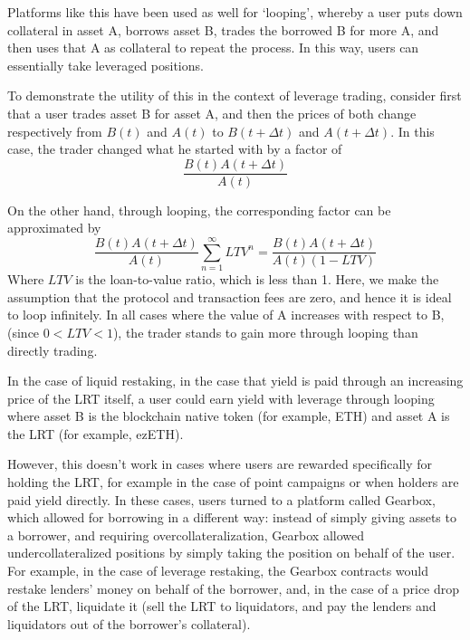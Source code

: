 \documentclass{article}
\begin{document}
Platforms like this have been used as well for `looping'\cite{looping}, whereby a user puts down collateral in asset A, borrows asset B, trades the borrowed B for more A, and then uses that A as collateral to repeat the process. In this way, users can essentially take leveraged positions. 

To demonstrate the utility of this in the context of leverage trading, consider first that a user trades asset B for asset A, and then the prices of both change respectively from $B(t)$ and $A(t)$ to $B(t+\Delta t)$ and $A(t+\Delta t)$. In this case, the trader changed what he started with by a factor of
$$
\frac{B(t)A(t+\Delta t)}{A(t)}
$$

On the other hand, through looping, the corresponding factor can be approximated by
$$
\frac{B(t)A(t+\Delta t)}{A(t)}\sum_{n=1}^{\infty}\textit{LTV}^n = \frac{B(t)A(t+\Delta t)}{A(t)(1 - \textit{LTV})}
$$
Where $\textit{LTV}$ is the loan-to-value ratio, which is less than 1. Here, we make the assumption that the protocol and transaction fees are zero, and hence it is ideal to loop infinitely. In all cases where the value of A increases with respect to B, (since $0 < \textit{LTV} < 1$), the trader stands to gain more through looping than directly trading.

In the case of liquid restaking, in the case that yield is paid through an increasing price of the LRT itself, a user could earn yield with leverage through looping where asset B is the blockchain native token (for example, ETH) and asset A is the LRT (for example, ezETH).

However, this doesn't work in cases where users are rewarded specifically for holding the LRT, for example in the case of point campaigns or when holders are paid yield directly.
In these cases, users turned to a platform called Gearbox, which allowed for borrowing in a different way: instead of simply giving assets to a borrower, and requiring overcollateralization, Gearbox allowed undercollateralized positions by simply taking the position on behalf of the user. For example, in the case of leverage restaking, the Gearbox contracts would restake lenders' money on behalf of the borrower, and, in the case of a price drop of the LRT, liquidate it (sell the LRT to liquidators, and pay the lenders and liquidators out of the borrower's collateral).
\end{document}

